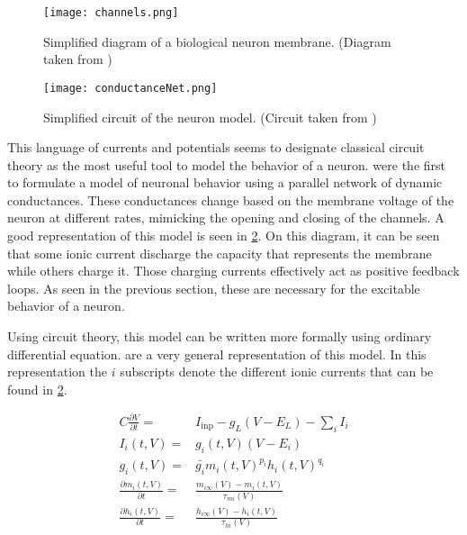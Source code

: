 \begin{figure}[htb]
    \centering
    \texttt{[image: channels.png]}
    \caption{Simplified diagram of a biological neuron membrane. (Diagram taken from \citet{channelDiagram})}
    \label{fig:conductance_neuron}
\end{figure}

\begin{figure}[htb]
    \centering
    \texttt{[image: conductanceNet.png]}
    \caption{Simplified circuit of the neuron model. (Circuit taken from \citet{electricDiagram})}
    \label{fig:conductance_neuron_circuit}
\end{figure}

This language of currents and potentials seems to designate classical circuit theory as the most useful tool to model the behavior of a neuron.
\citet{conductanceModel} were the first to formulate a model of neuronal behavior using a parallel network of dynamic conductances.
These conductances change based on the membrane voltage of the neuron at different rates, mimicking the opening and closing of the channels.
A good representation of this model is seen in \cref{fig:conductance_neuron_circuit}.
On this diagram, it can be seen that some ionic current discharge the capacity that represents the membrane while others charge it.
Those charging currents effectively act as positive feedback loops.
As seen in the previous section, these are necessary for the excitable behavior of a neuron.

Using circuit theory, this model can be written more formally using ordinary differential equation. 
 are a very general representation of this model.
In this representation the $i$ subscripts denote the different ionic currents that can be found in \cref{fig:conductance_neuron_circuit}.

\begin{align}
    C\frac{\partial V}{\partial t} =& I_\text{inp} - g_L\left(V-E_L\right) - \sum_i I_i\label{eq:hodgkinstart}\\
    I_i\left(t, V\right) =& g_i\left(t, V\right)\left(V - E_i\right)\\
    g_i\left(t, V\right) =& \bar{g_i}m_i\left(t, V\right)^{p_i} h_i\left(t, V\right)^{q_i}\\
    \frac{\partial m_i\left(t, V\right)}{\partial t} =& \frac{m_{i\infty}\left(V\right) - m_i\left(t, V\right)}{\tau_{mi}\left(V\right)}\\
    \frac{\partial h_i\left(t, V\right)}{\partial t} =& \frac{h_{i\infty}\left(V\right) - h_i\left(t, V\right)}{\tau_{hi}\left(V\right)}\label{eq:hodgkinend}
\end{align}

